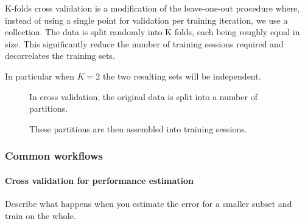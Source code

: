K-folds cross validation is a modification of the leave-one-out procedure where, instead of using a single point for validation per training iteration, we use a collection. The data is split randomly into K folds, each being roughly equal in size. This significantly reduce the number of training sessions required and decorrelates the training sets.

In particular when $K=2$ the two resulting sets will be independent.

\begin{center}
\begin{figure}
   \missingfigure{}
   \label{fig:cv}
   \caption{In cross validation, the original data is split into a number of partitions.}
\end{figure}
\end{center}

\begin{center}
\begin{figure}
   \missingfigure{}
   \label{fig:cv2}
   \caption{These partitions are then assembled into training sessions.}
\end{figure}
\end{center}





\subsubsection{Common workflows}

\paragraph{Cross validation for performance estimation}
Describe what happens when you estimate the error for a smaller subset and train on the whole.

